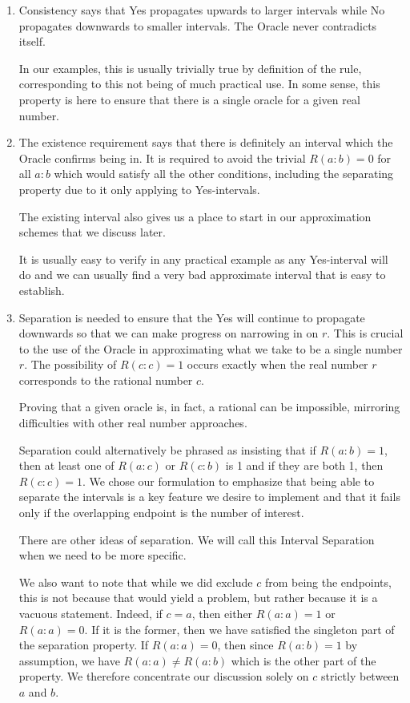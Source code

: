 \documentclass[12pt]{article}
\begin{document}
\begin{enumerate}

    \item Consistency says that Yes propagates upwards to larger intervals while No propagates downwards to smaller intervals. The Oracle never contradicts itself. 
    
    In our examples, this is usually trivially true by definition of the rule, corresponding to this not being of much practical use. In some sense, this property is here to ensure that there is a single oracle for a given real number.  

    \item The existence requirement says that there is definitely an interval which the Oracle confirms being in. It is required to avoid the trivial $R(a:b) = 0$ for all $a:b$ which would satisfy all the other conditions, including the separating property due to it only applying to Yes-intervals. 
    
    The existing interval also gives us a place to start in our approximation schemes that we discuss later. 
    
    It is usually easy to verify in any practical example as any Yes-interval will do and we can usually find a very bad approximate interval that is easy to establish.  

    \item Separation is needed to ensure that the Yes will continue to propagate downwards so that we can make progress on narrowing in on $r$. This is crucial to the use of the Oracle in approximating what we take to be a single number $r$. The possibility of $R(c:c) = 1$ occurs exactly when the real number $r$ corresponds to the rational number $c$. 
    
    Proving that a given oracle is, in fact, a rational can be impossible, mirroring difficulties with other real number approaches. 

    Separation could alternatively be phrased as insisting that if $R(a:b) = 1$, then at least one of $R(a:c)$ or $R(c:b)$ is 1 and if they are both 1, then $R(c:c) = 1$. We chose our formulation to emphasize that being able to separate the intervals is a key feature we desire to implement and that it fails only if the overlapping endpoint is the number of interest. 

    There are other ideas of separation. We will call this Interval Separation when we need to be more specific. 

    We also want to note that while we did exclude $c$ from being the endpoints, this is not because that would yield a problem, but rather because it is a vacuous statement. Indeed, if $c=a$, then either $R(a:a)=1$ or $R(a:a)=0$. If it is the former, then we have satisfied the singleton part of the separation property. If $R(a:a)=0$, then since $R(a:b)=1$ by assumption, we have $R(a:a) \neq R(a:b)$ which is the other part of the property. We therefore concentrate our discussion solely on $c$ strictly between $a$ and $b$.
    

\end{enumerate}
\end{document}

